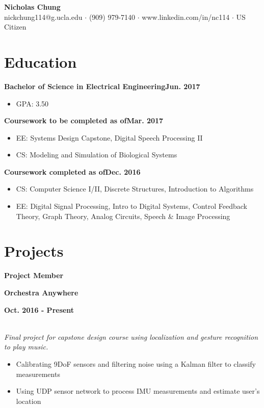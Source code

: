 \documentclass[12pt]{article}
\newcommand\textbox[1]{\parbox{.333\textwidth}{#1}}
\newcommand{\textlcr}[3]{\textbox{\textbf{#1}\hfill}\textbox{\hfil \textbf{#2}\hfil}\textbox{\hfill \textbf{#3}}}
\begin{document}
\begin{center}
	\textbf{\LARGE Nicholas Chung} \\ \vspace{.5ex}
	nickchung114@g.ucla.edu $\cdot$ (909) 979-7140 $\cdot$ www.linkedin.com/in/nc114 $\cdot$ US Citizen
\end{center}

\vspace{-8pt}
\smallskip
\section*{Education}
\vspace*{-1em}\makebox[\linewidth]{\rule{\textwidth}{0.4pt}}

\textbf{Bachelor of Science in Electrical Engineering}\hfill\textbf{Jun. 2017}
\begin{itemize}
\item GPA: 3.50
\end{itemize}

\textbf{Coursework to be completed as of}\hfill\textbf{Mar. 2017}
\begin{itemize}
\item EE: Systems Design Capstone, Digital Speech Processing II
\item CS: Modeling and Simulation of Biological Systems
\end{itemize}

\textbf{Coursework completed as of}\hfill\textbf{Dec. 2016}
\begin{itemize}
\item CS: Computer Science I/II, Discrete Structures, Introduction to Algorithms
\item EE: Digital Signal Processing, Intro to Digital Systems, Control Feedback Theory, Graph Theory, Analog Circuits,  Speech \& Image Processing
\end{itemize}

\section*{Projects}
\vspace*{-1em}\makebox[\linewidth]{\rule{\textwidth}{0.4pt}}

\textlcr{Project Member}{Orchestra Anywhere}{Oct. 2016 - Present}
\\ \textit{Final project for capstone design course using localization and gesture recognition to play music.}
\begin{itemize}
\item Calibrating 9DoF sensors and filtering noise using a Kalman filter to classify measurements
\item Using UDP sensor network to process IMU measurements and estimate user's location
\end{itemize}
\end{document}
